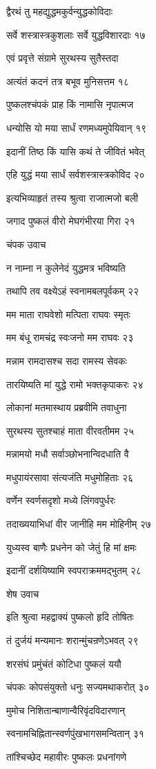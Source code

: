 द्वैरथं तु महद्युद्धमकुर्वन्युद्धकोविदाः

सर्वे शस्त्रास्त्रकुशलाः सर्वे युद्धविशारदाः १७

एवं प्रवृत्ते संग्रामे सुरथस्य सुतैस्तदा

अत्यंतं कदनं तत्र बभूव मुनिसत्तम १८

पुष्कलश्चंपकं प्राह किं नामासि नृपात्मज

धन्योसि यो मया सार्धं रणमध्यमुपेयिवान् १९

इदानीं तिष्ठ किं यासि कथं ते जीवितं भवेत्

एहि युद्धं मया सार्धं सर्वशस्त्रास्त्रकोविद २०

इत्यभिव्याहृतं तस्य श्रुत्वा राजात्मजो बली

जगाद पुष्कलं वीरो मेघगंभीरया गिरा २१

चंपक उवाच

न नाम्ना न कुलेनेदं युद्धमत्र भविष्यति

तथापि तव वक्ष्येऽहं स्वनामबलपूर्वकम् २२

मम माता राघवेशो मत्पिता राघवः स्मृतः

मम बंधू रामचंद्र स्वःजनो मम राघवः २३

मन्नाम रामदासश्च सदा रामस्य सेवकः

तारयिष्यति मां युद्धे रामो भक्तकृपाकरः २४

लोकानां मतमास्थाय प्रब्रवीमि तवाधुना

सुरथस्य सुतश्चाहं माता वीरवतीमम २५

मन्नामयो मधौ सर्वाञ्छोभनान्विदधाति वै

मधुपायंरसावा संत्यजंति मधुमोहिताः २६

वर्णेन स्वर्णसदृशो मध्ये लिंगवपुर्धरः

तदाख्ययाभिधां वीर जानीहि मम मोहिनीम् २७

युध्यस्व बाणैः प्रधनेन को जेतुं हि मां क्षमः

इदानीं दर्शयिष्यामि स्वपराक्रममद्भुतम् २८

शेष उवाच

इति श्रुत्वा महद्वाक्यं पुष्कलो हृदि तोषितः

तं दुर्जयं मन्यमानः शरान्मुंचन्रणेऽभवत् २९

शरसंघं प्रमुंचंतं कोटिधा पुष्कलं ययौ

चंपकः कोपसंयुक्तो धनुः सज्यमथाकरोत् ३०

मुमोच निशितान्बाणान्वैरिवृंदविदारणान्

स्वनामचिह्नितान्स्वर्णपुंखभागसमन्वितान् ३१

तांश्चिच्छेद महावीरः पुष्कलः प्रधनांगणे

